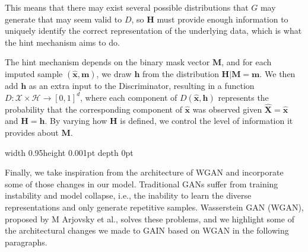 
This means that there may exist several possible distributions that \( G \) may generate that may seem valid to \( D \), so \( \mathbf{H} \) must provide enough information to uniquely identify the correct representation of the underlying data, which is what the hint mechanism aims to do.

The hint mechanism depends on the binary mask vector \( \mathbf{M} \), and for each imputed sample \( (\hat{\mathbf{x}}, \mathbf{m}) \), we draw \( \mathbf{h} \) from the distribution \( \mathbf{H} | \mathbf{M} = \mathbf{m} \). We then add \( \mathbf{h} \) as an extra input to the Discriminator, resulting in a function \( D: \mathcal{X} \times \mathcal{H} \rightarrow [0, 1]^d \), where each component of \( D(\hat{\mathbf{x}}, \mathbf{h}) \) represents the probability that the corresponding component of \( \hat{\mathbf{x}} \) was observed given \( \hat{\mathbf{X}} = \hat{\mathbf{x}} \) and \( \mathbf{H} = \mathbf{h} \).
By varying how \( \mathbf{H} \) is defined, we control the level of information it provides about \( \mathbf{M} \).

\textcolor{gray!80}{\vrule width 0.95\columnwidth height 0.001pt depth 0pt \relax}

\vspace{1ex}

Finally, we take inspiration from the architecture of WGAN and incorporate some of those changes in our model. Traditional GANs suffer from training instability and model collapse, i.e., the inability to learn the diverse representations and only generate repetitive samples. Wasserstein GAN (WGAN), proposed by M Arjovsky et al., solves these problems, and we highlight some of the architectural changes we made to GAIN based on WGAN in the following paragraphs.

